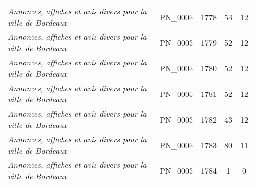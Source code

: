 \begin{table}[ht]
{\begin{tabular}{lcccc}
			\textit{Annonces, affiches et avis divers pour la ville de Bordeaux} & PN\_0003                           & 1778                                & 53                                                & 12                                              \\ 
			\textit{Annonces, affiches et avis divers pour la ville de Bordeaux} & PN\_0003                           & 1779                                & 52                                                & 12                                              \\ 
			\textit{Annonces, affiches et avis divers pour la ville de Bordeaux} & PN\_0003                           & 1780                                & 52                                                & 12                                              \\ 
			\textit{Annonces, affiches et avis divers pour la ville de Bordeaux} & PN\_0003                           & 1781                                & 52                                                & 12                                              \\ 
			\textit{Annonces, affiches et avis divers pour la ville de Bordeaux} & PN\_0003                           & 1782                                & 43                                                & 12                                              \\ 
			\textit{Annonces, affiches et avis divers pour la ville de Bordeaux} & PN\_0003                           & 1783                                & 80                                                & 11                                              \\ 
			\textit{Annonces, affiches et avis divers pour la ville de Bordeaux} & PN\_0003                           & 1784                                & 1                                                 & 0                                               \\ \hline
	\end{tabular}}
\end{table}



